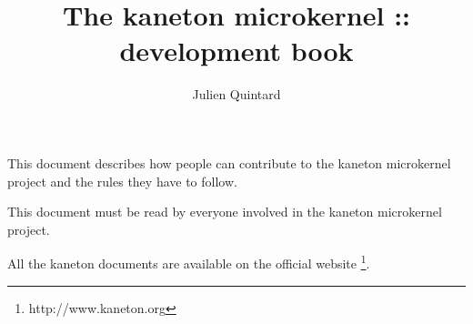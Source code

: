 %
%
%
%
%
%

%
%

\def\path{../..}

%
%



%
%

\rhead{}

%
%

\title{The kaneton microkernel :: development book
       \logos}

%
%

\author{\small{Julien Quintard}}

%
%



%
%

\maketitle

%
%

This document describes how people can contribute to the kaneton microkernel
project and the rules they have to follow.

This document must be read by everyone involved in the kaneton microkernel
project.

All the kaneton documents are available on
the official website
  \footnote{http://www.kaneton.org}.

%
%

\tableofcontents

%
%





%
%
%
%

%
%



%
%

